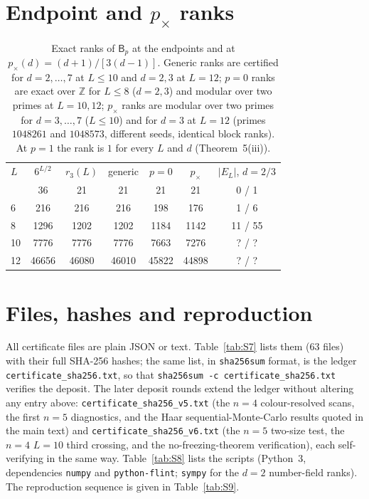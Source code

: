 \documentclass[aps,prx,reprint,superscriptaddress,nobibnotes,longbibliography]{revtex4-2}
\begin{document}
\section{Endpoint and $p_\times$ ranks}
\label{sm:endpoints}

\begin{table}[h]
\caption{Exact ranks of $\mathsf B_p$ at the endpoints and at $p_\times(d)=(d+1)/[3(d-1)]$.  Generic ranks are certified for $d=2,\ldots,7$ at $L\le10$ and $d=2,3$ at $L=12$; $p=0$ ranks are exact over $\mathbb Z$ for $L\le8$ ($d=2,3$) and modular over two primes at $L=10,12$; $p_\times$ ranks are modular over two primes for $d=3,\ldots,7$ ($L\le10$) and for $d=3$ at $L=12$ (primes $1048261$ and $1048573$, different seeds, identical block ranks).  At $p=1$ the rank is $1$ for every $L$ and $d$ (Theorem~5(iii)).}
\label{tab:S6}
\small
\begin{ruledtabular}
\begin{tabular}{lcccccc}
$L$ & $6^{L/2}$ & $r_3(L)$ & generic & $p=0$ & $p_\times$ & $|E_L|$, $d=2/3$\\
\colrule
4 & 36 & 21 & 21 & 21 & 21 & 0 / 1\\
6 & 216 & 216 & 216 & 198 & 176 & 1 / 6\\
8 & 1296 & 1202 & 1202 & 1184 & 1142 & 11 / 55\\
10 & 7776 & 7776 & 7776 & 7663 & 7276 & ? / ?\\
12 & 46656 & 46080 & 46010 & 45822 & 44898 & ? / ?\\
\end{tabular}
\end{ruledtabular}
\end{table}

\section{Files, hashes and reproduction}
\label{sm:files}

All certificate files are plain JSON or text.  Table~\ref{tab:S7} lists them ($63$ files) with their full SHA-256 hashes; the same list, in \texttt{sha256sum} format, is the ledger \texttt{certificate\_sha256.txt}, so that \texttt{sha256sum -c certificate\_sha256.txt} verifies the deposit.  The later deposit rounds extend the ledger without altering any entry above: \texttt{certificate\_sha256\_v5.txt} (the $n=4$ colour-resolved scans, the first $n=5$ diagnostics, and the Haar sequential-Monte-Carlo results quoted in the main text) and \texttt{certificate\_sha256\_v6.txt} (the $n=5$ two-size test, the $n=4$ $L=10$ third crossing, and the no-freezing-theorem verification), each self-verifying in the same way.  Table~\ref{tab:S8} lists the scripts (Python~3, dependencies \texttt{numpy} and \texttt{python-flint}; \texttt{sympy} for the $d=2$ number-field ranks).  The reproduction sequence is given in Table~\ref{tab:S9}.
\end{document}
